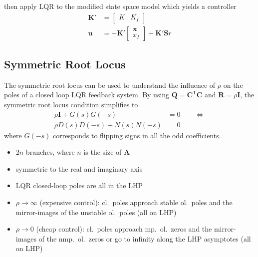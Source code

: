 then apply LQR to the modified state space model which yields a controller
\begin{align*}
    \mathbf{K}' & =\begin{bmatrix}
                       K & K_I
                   \end{bmatrix}                            \\
    \mathbf{u}  & =-\mathbf{K}'\begin{bmatrix}
                                   \mathbf{x} \\
                                   x_I
                               \end{bmatrix} + \mathbf{K'S}r
\end{align*}

\subsection{Symmetric Root Locus}
The symmetric root locus can be used to understand the influence of $\rho$ on the poles of a closed loop LQR feedback system.
By using $\mathbf{Q}=\mathbf{C}^{\mathsf{T}} \mathbf{C}$ and $\mathbf{R}=\rho \mathbf{I}$, the symmetric root locus condition simplifies to
\noindent\begin{align*}
    \rho \mathbf{I}+G(s)G(-s) & =0 \qquad \Leftrightarrow \\
    \rho D(s)D(-s)+N(s)N(-s)  & =0
\end{align*}
where $G(-s)$ corresponds to flipping signs in all the odd coefficients.

\begin{itemize}
    \item $2n$ branches, where $n$ is the size of $\mathbf{A}$
    \item symmetric to the real and imaginary axis
    \item LQR closed-loop poles are all in the LHP
    \item $\rho \rightarrow \infty$ (expensive control):\newline
          cl.\ poles approach stable ol.\ poles and the mirror-images of the unstable ol.\ poles (all on LHP)
    \item $\rho \rightarrow 0$ (cheap control):\newline
          cl.\ poles approach mp.\ ol.\ zeros and the mirror-images of the nmp.\ ol.\ zeros or go to infinity along the LHP asymptotes (all on LHP)
\end{itemize}

